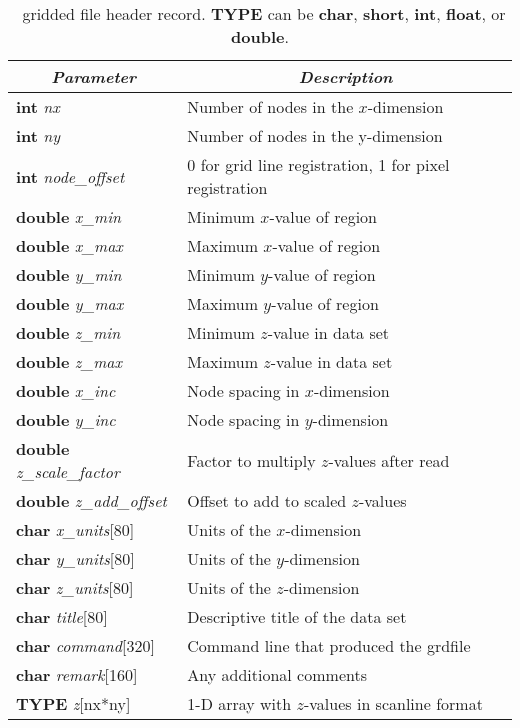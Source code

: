 \begin{table}
\centering
\begin{tabular}{|l|l|} \hline
\multicolumn{1}{|c}{\emph{Parameter}}   &       \multicolumn{1}{|c|}{\emph{Description}}        \\ \hline
{\bf int} {\it nx}                      &       Number of nodes in the $x$-dimension    \\ \hline
{\bf int} {\it ny}                      &       Number of nodes in the y-dimension      \\ \hline
{\bf int} {\it node\_offset}    &       0 for grid line registration, 1 for pixel registration  \\ \hline
{\bf double} {\it x\_min}               &       Minimum $x$-value of region     \\ \hline
{\bf double} {\it x\_max}               &       Maximum $x$-value of region  \\ \hline
{\bf double} {\it y\_min}               &       Minimum $y$-value of region  \\ \hline
{\bf double} {\it y\_max}               &       Maximum $y$-value of region  \\ \hline
{\bf double} {\it z\_min}               &       Minimum $z$-value in data set  \\ \hline
{\bf double} {\it z\_max}               &       Maximum $z$-value in data set  \\ \hline
{\bf double} {\it x\_inc}               &       Node spacing in $x$-dimension  \\ \hline
{\bf double} {\it y\_inc}               &       Node spacing in $y$-dimension  \\ \hline
{\bf double} {\it z\_scale\_factor}     &       Factor to multiply $z$-values after read  \\ \hline
{\bf double} {\it z\_add\_offset}       &       Offset to add to scaled $z$-values  \\ \hline
{\bf char} {\it x\_units}[80]   &       Units of the $x$-dimension      \\ \hline
{\bf char} {\it y\_units}[80]   &       Units of the $y$-dimension      \\ \hline
{\bf char} {\it z\_units}[80]   &       Units of the $z$-dimension      \\ \hline 
{\bf char} {\it title}[80]      &       Descriptive title of the data set       \\ \hline
{\bf char} {\it command}[320]   &       Command line that produced the grdfile  \\ \hline
{\bf char} {\it remark}[160]    &       Any additional comments \\ \hline \hline
{\bf TYPE} {\it z}[nx*ny]      &       1-D array with $z$-values in scanline format \\ \hline
\end{tabular}
\caption{\gmt\ gridded file header record. {\bf TYPE} can be {\bf char}, {\bf short}, {\bf int}, {\bf float}, or {\bf
double}.}
\label{tbl:grdheader}
\end{table}

